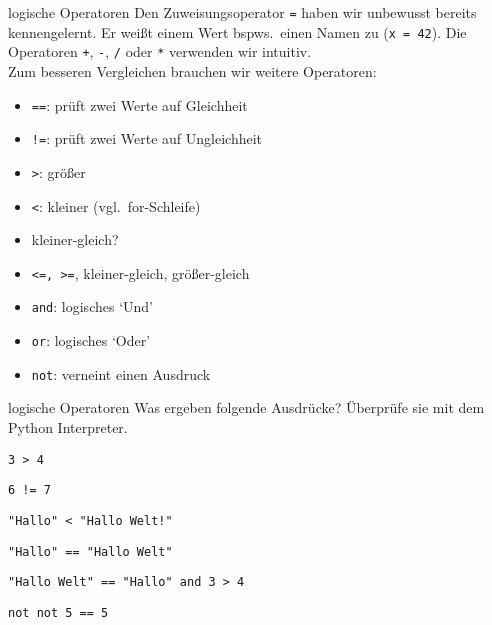 \begin{frame}[fragile]{logische Operatoren}
Den Zuweisungsoperator \texttt{=} haben wir unbewusst bereits kennengelernt. 
Er weißt einem Wert bspws.\ einen Namen zu (\lstinline{x = 42}). Die Operatoren 
\texttt{+}, \texttt{-}, \texttt{/} oder \texttt{*} verwenden wir intuitiv.\\

Zum besseren Vergleichen brauchen wir weitere Operatoren:
\begin{itemize}
    \item \texttt{==}: prüft zwei Werte auf Gleichheit
    \item \texttt{!=}: prüft zwei Werte auf Ungleichheit
    \item \texttt{>}: größer
    \item \texttt{<}: kleiner (vgl.\ for-Schleife)
    \item kleiner-gleich?
    \pause{}
    \item \texttt{<=, >=}, kleiner-gleich, größer-gleich
    \item \texttt{and}: logisches `Und'
    \item \texttt{or}: logisches `Oder'
    \item \texttt{not}: verneint einen Ausdruck
\end{itemize}
\end{frame}

\begin{frame}[fragile]{logische Operatoren}
Was ergeben folgende Ausdrücke? Überprüfe sie mit dem Python Interpreter.

\begin{lstlisting} 
3 > 4 
\end{lstlisting}

\begin{lstlisting} 
6 != 7
\end{lstlisting}

\begin{lstlisting} 
"Hallo" < "Hallo Welt!"
\end{lstlisting}

\begin{lstlisting} 
"Hallo" == "Hallo Welt"
\end{lstlisting}

\begin{lstlisting} 
"Hallo Welt" == "Hallo" and 3 > 4
\end{lstlisting}

\begin{lstlisting} 
not not 5 == 5
\end{lstlisting}

\end{frame}
